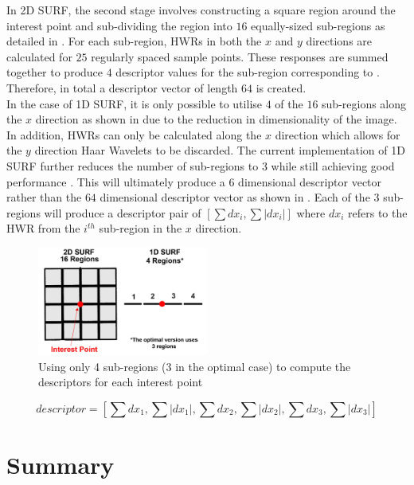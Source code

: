 \documentclass{report}
\begin{document}
In 2D SURF, the second stage involves constructing a square region around the interest point and sub-dividing the region into $16$ equally-sized sub-regions as detailed in . For each sub-region, HWRs in both the $x$ and $y$ directions are calculated for $25$ regularly spaced sample points. These responses are summed together to produce $4$ descriptor values for the sub-region corresponding to . Therefore, in total a descriptor vector of length $64$ is created.\\

In the case of 1D SURF, it is only possible to utilise $4$ of the $16$ sub-regions along the $x$ direction as shown in  due to the reduction in dimensionality of the image. In addition, HWRs can only be calculated along the $x$ direction which allows for the $y$ direction Haar Wavelets to be discarded. The current implementation of 1D SURF further reduces the number of sub-regions to $3$ while still achieving good performance \cite{Anderson}. This will ultimately produce a $6$ dimensional descriptor vector rather than the $64$ dimensional descriptor vector as shown in . Each of the $3$ sub-regions will produce a descriptor pair of $[\sum dx_i, \sum |dx_i|]$ where $dx_i$ refers to the HWR from the $i^{th}$ sub-region in the $x$ direction. \\

\begin{figure}[h!] 
  \centering
    \includegraphics[width=0.5\textwidth]{../Drawings/methods/SURF1D_Descriptor.jpg}
    \caption{Using only 4 sub-regions (3 in the optimal case) to compute the descriptors for each interest point}
    \label{fig:subregions4}
\end{figure}


\begin{equation}
descriptor = [ \sum dx_1, \sum |dx_1|,\sum dx_2, \sum |dx_2|,\sum dx_3, \sum |dx_3|] 
\label{eqn:descriptor1d}
\end{equation}

\section{Summary}
\label{sec:summary3}
\end{document}

